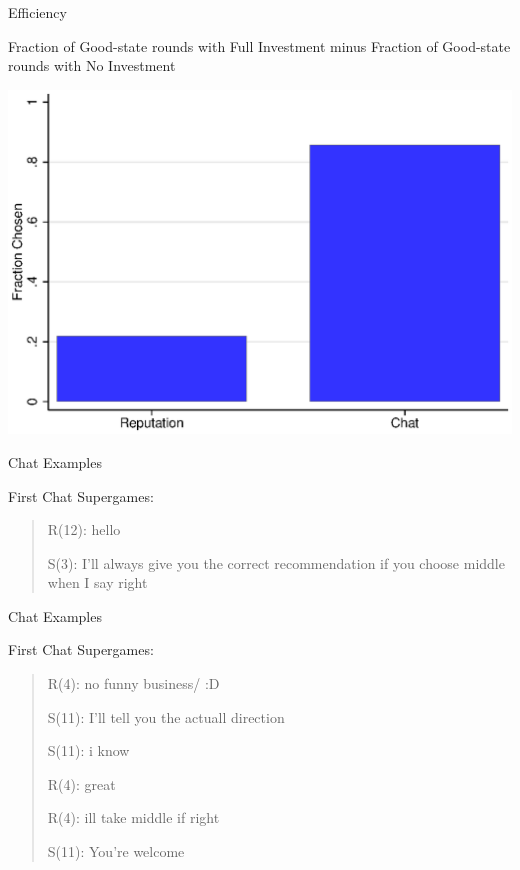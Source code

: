 \documentclass{beamer}
\begin{document}
\begin{frame}{Efficiency }
\begin{center}
Fraction of Good-state rounds with Full Investment minus Fraction
of Good-state rounds with No Investment
\par\end{center}

\begin{center}
\includegraphics[scale=0.6]{./i/E1_ChatL5A.eps}
\par\end{center}

\end{frame}
\begin{frame}{Chat Examples}

First Chat Supergames:
\begin{quotation}
R(12): hello 

S(3): I'll always give you the correct recommendation if you choose
middle when I say right
\end{quotation}
\end{frame}

\begin{frame}{Chat Examples}

First Chat Supergames:
\begin{quotation}
R(4): no funny business/ :D 

S(11): I'll tell you the actuall direction 

S(11): i know 

R(4): great 

R(4): ill take middle if right 

S(11): You're welcome
\end{quotation}
\end{frame}
\end{document}
